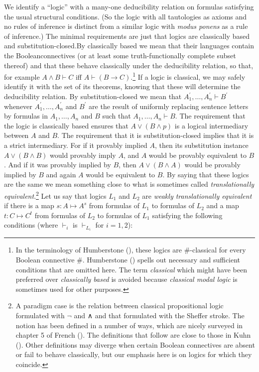 \documentclass[
  11pt,
  letterpaper,
  DIV=11,
  numbers=noendperiod,
  twoside]{scrartcl}
\begin{document}
We identify a ``logic'' with a many-one deducibility relation on
formulas satisfying the usual structural conditions. (So the logic with
all tautologies as axioms and no rules of inference is distinct from a
similar logic with \emph{modus ponens} as a rule of inference.) The
minimal requirements are just that logics are classically based and
substitution-closed.By classically based we mean that their languages
contain the Booleanconnectives (or at least some truth-functionally
complete subset thereof) and that these behave classically under the
deducibility relation, so that, for example \(A \wedge B \vdash C\) iff
\(A \vdash (B \rightarrow C)\).\footnote{In the terminology of
  Humberstone (), these logics
  are \(\#\)-classical for every Boolean connective \(\#\). Humberstone
  () spells out necessary and
  sufficient conditions that are omitted here. The term \emph{classical}
  which might have been preferred over \emph{classically based} is
  avoided because \emph{classical modal logic} is sometimes used for
  other purposes.} If a logic is classical, we may safely identify it
with the set of its theorems, knowing that these will determine the
deducibility relation. By substitution-closed we mean that
\(A_1^\prime,{\ldots},A_n^\prime \vdash B^\prime\) whenever
\(A_1^\prime,{\ldots},A_n^\prime\) and \(B^\prime\) are the result of
uniformly replacing sentence letters by formulas in \(A_1,{\ldots},A_n\)
and \(B\) such that \(A_1,{\ldots},A_n \vdash B\). The requirement that
the logic is classically based ensures that \(A\vee (B\wedge p)\) is a
logical intermediary between \(A\) and \(B\). The requirement that it is
substitution-closed implies that it is a strict intermediary. For if it
provably implied \(A\), then its substitution instance
\(A\vee (B\wedge B)\) would provably imply \(A\), and \(A\) would be
provably equivalent to \(B\). And if it was provably implied by \(B\),
then \(A\vee (B\wedge A)\) would be provably implied by \(B\) and again
\(A\) would be equivalent to \(B\). By saying that these logics are the
same we mean something close to what is sometimes called
\emph{translationally equivalent}.\footnote{A paradigm case is the
  relation between classical propositional logic formulated with
  \(\neg\) and ∧ and that formulated with the Sheffer stroke. The notion
  has been defined in a number of ways, which are nicely surveyed in
  chapter 5 of French (). The definitions
  that follow are close to those in Kuhn
  (). Other definitions may diverge when
  certain Boolean connectives are absent or fail to behave classically,
  but our emphasis here is on logics for which they coincide.} Let us
say that logics \(L_1\) and \(L_2\) are \emph{weakly translationally
equivalent} if there is a map \(s\colon A{\mapsto}A^s\) from formulas of
\(L_1\) to formulas of \(L_2\) and a map \(t\colon C{\mapsto}C^t\) from
formulas of \(L_2\) to formulas of \(L_1\) satisfying the following
conditions (where \(\vdash_i\) is \(\vdash_{L_i}\) for \(i=1,2\)):
\end{document}
